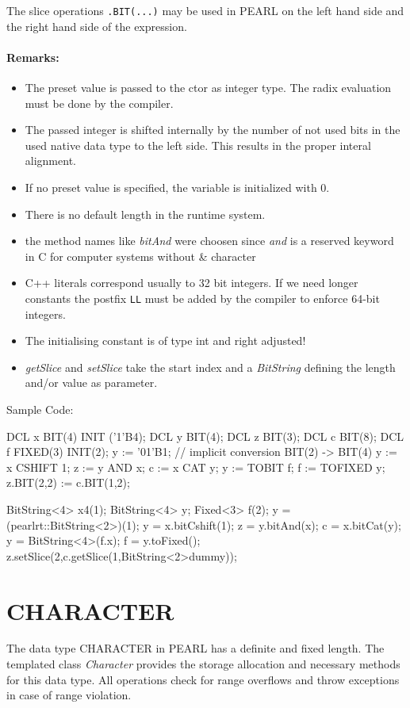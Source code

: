 The slice operations \verb|.BIT(...)| may be used in PEARL 
on the left hand side and the right hand side of the expression.
 

\paragraph{Remarks:}
\begin{itemize}
\item The preset value is passed to the ctor as integer type. The
   radix evaluation must be done by the compiler.
\item The passed integer is shifted internally by the number of not used 
   bits in the used native data type to the left side. This results
   in the proper interal alignment.
\item If no preset value is specified, the variable is initialized with 0.
\item There is no default length in the runtime system.
\item the method names like {\em bitAnd} were choosen since {\em and} 
is a reserved keyword in C for computer systems without \& character
\item C++ literals correspond usually to 32 bit integers. 
If we need longer constants the postfix \verb|LL| must be added by
the compiler to enforce 64-bit integers.
\item The initialising constant is of type int and right adjusted!
\item {\em getSlice} and {\em setSlice} take the start index and a 
    {\em BitString} defining the length and/or value as parameter.
\end{itemize}

Sample Code:
\begin{PEARLCode}
DCL x BIT(4) INIT ('1'B4);
DCL y BIT(4);
DCL z BIT(3);
DCL c BIT(8);
DCL f FIXED(3) INIT(2);
y := '01'B1;  // implicit conversion BIT(2) -> BIT(4)
y := x CSHIFT 1;
z := y AND x;
c := x CAT y;
y := TOBIT f;
f := TOFIXED y;
z.BIT(2,2)  := c.BIT(1,2);
\end{PEARLCode}

\begin{CppCode}
BitString<4> x4(1);
BitString<4> y;
Fixed<3> f(2);
y = (pearlrt::BitString<2>)(1);
y = x.bitCshift(1);
z = y.bitAnd(x);
c = x.bitCat(y);
y = BitString<4>(f.x);
f = y.toFixed();
z.setSlice(2,c.getSlice(1,BitString<2>dummy));
\end{CppCode}

\section{CHARACTER}
The data type CHARACTER in PEARL has a definite and fixed length.
The templated class {\em Character} provides the storage allocation
and necessary methods for this data type.
All operations check for range overflows and throw exceptions in case of
range violation.


